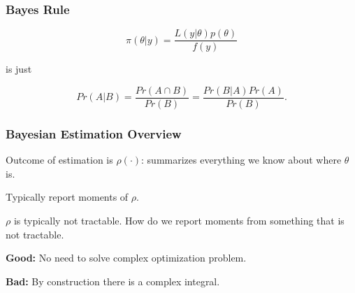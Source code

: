 \documentclass[11pt, aspectratio=169]{beamer}
\newenvironment{wideitemize}{\itemize\addtolength{\itemsep}{10pt}}{\enditemize}
\begin{document}
\begin{frame}[c]\frametitle{Bayes Rule}
    
$$\pi(\theta | y) = \frac{L(y | \theta) p(\theta)}{f(y)}$$ 

is just

$$Pr(A | B) = \frac{Pr(A \cap B)}{Pr(B)} = \frac{Pr(B|A) Pr(A)}{Pr(B)}.$$

\end{frame}


\begin{frame}[c]\frametitle{Bayesian Estimation Overview}
    
\begin{wideitemize}
    \item Outcome of estimation is $\rho(\cdot)$: summarizes everything we know about where $\theta$ is.
    \item Typically report moments of $\rho$.
    \item $\rho$ is typically not tractable. How do we report moments from something that is not tractable. 
\end{wideitemize}    

\vspace{1em}
\textbf{Good:} No need to solve complex optimization problem.

\vspace{1em}
\textbf{Bad:} By construction there is a complex integral.

\end{frame}
\end{document}
